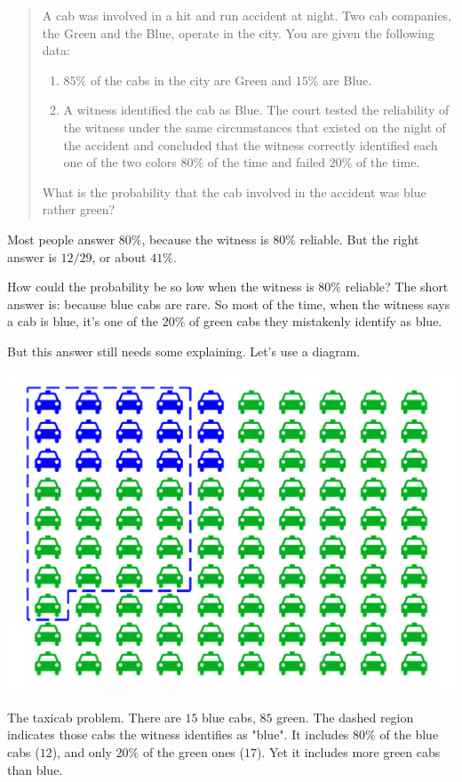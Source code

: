 \documentclass[justified]{tufte-book}
\providecommand{\tightlist}{%
  \setlength{\itemsep}{0pt}\setlength{\parskip}{0pt}}
\newenvironment{problem}{\begin{quote}\normalsize}{\end{quote}}
\theoremstyle{definition}
\theoremstyle{definition}
\theoremstyle{definition}
\theoremstyle{remark}
\begin{document}
\begin{problem}
A cab was involved in a hit and run accident at night. Two cab
companies, the Green and the Blue, operate in the city. You are given
the following data:

\begin{enumerate}
\def\labelenumi{\arabic{enumi}.}
\tightlist
\item
  \(85\%\) of the cabs in the city are Green and \(15\%\) are Blue.
\item
  A witness identified the cab as Blue. The court tested the reliability
  of the witness under the same circumstances that existed on the night
  of the accident and concluded that the witness correctly identified
  each one of the two colors \(80\%\) of the time and failed \(20\%\) of
  the time.
\end{enumerate}

What is the probability that the cab involved in the accident was blue
rather green?
\end{problem}

Most people answer \(80\%\), because the witness is \(80\%\) reliable. But the right answer is \(12/29\), or about \(41\%\).

How could the probability be so low when the witness is \(80\%\) reliable? The short answer is: because blue cabs are rare. So most of the time, when the witness says a cab is blue, it's one of the \(20\%\) of green cabs they mistakenly identify as blue.

But this answer still needs some explaining. Let's use a diagram.

\begin{marginfigure}
\includegraphics{_main_files/figure-latex/taxigrid-11} \caption[The taxicab problem]{The taxicab problem. There are $15$ blue cabs, $85$ green. The dashed region indicates those cabs the witness identifies as "blue". It includes $80\%$ of the blue cabs ($12$), and only $20\%$ of the green ones ($17$). Yet it includes more green cabs than blue.}\label{fig:taxigrid}
\end{marginfigure}
\end{document}
